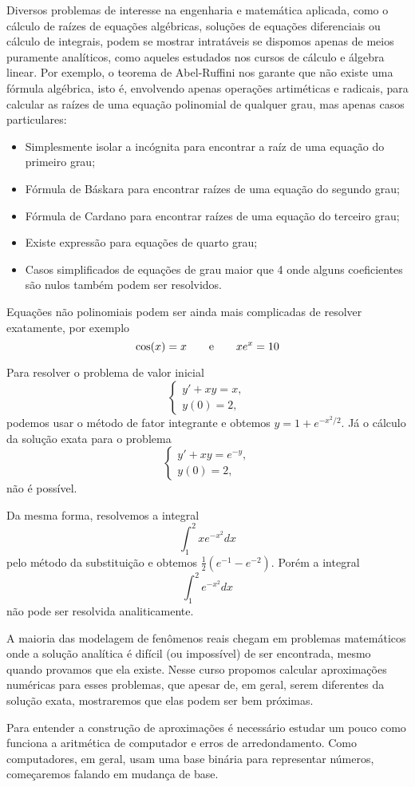 Diversos problemas de interesse na engenharia e matemática aplicada, como  o cálculo de raízes de equações algébricas, soluções de equações diferenciais ou cálculo de integrais, podem se mostrar intratáveis se dispomos apenas de meios puramente analíticos, como aqueles estudados nos cursos de cálculo e álgebra linear. Por exemplo, o teorema de Abel-Ruffini nos garante que não existe uma fórmula algébrica, isto é, envolvendo apenas operações artiméticas e radicais, para calcular as raízes de uma equação polinomial de qualquer grau, mas apenas casos particulares:
\begin{itemize}
\item Simplesmente isolar a incógnita para encontrar a raíz de uma equação do primeiro grau;
\item Fórmula de Báskara para encontrar raízes de uma equação do segundo grau;
\item Fórmula de Cardano para encontrar raízes de uma equação do terceiro grau;
\item Existe expressão para equações de quarto grau;
\item Casos simplificados de equações de grau maior que 4 onde alguns coeficientes são nulos também podem ser resolvidos.
\end{itemize}
Equações não polinomiais podem ser ainda mais complicadas de resolver exatamente, por exemplo
$$
\cos(x)=x\qquad \hbox{e}\qquad xe^x= 10
$$

Para resolver o problema de valor inicial 
$$\left\{
\begin{array}{l}
y'+xy=x,\\
y(0)=2,
\end{array}\right.
$$
podemos usar o método de fator integrante e obtemos $y=1+e^{-x^2/2}$. Já o cálculo da solução exata para o problema 
$$\left\{
\begin{array}{l}
y'+xy=e^{-y},\\
y(0)=2,
\end{array}\right.
$$
não é possível.

Da mesma forma, resolvemos a integral
$$
\int_1^2xe^{-x^2}dx
$$
pelo método da substituição e obtemos $\frac{1}{2}(e^{-1}-e^{-2})$. Porém a integral
$$
\int_1^2 e^{-x^2} dx
$$
não pode ser resolvida analiticamente.

A maioria das modelagem de fenômenos reais chegam em problemas matemáticos onde a solução analítica é difícil (ou impossível) de ser encontrada, mesmo quando provamos que ela existe. Nesse curso propomos calcular aproximações numéricas para esses problemas, que apesar de, em geral, serem diferentes da solução exata, mostraremos que elas podem ser bem próximas.

Para entender a construção de aproximações é necessário estudar um pouco como funciona a aritmética de computador e erros de arredondamento. Como computadores, em geral, usam uma base binária para representar números, começaremos falando em mudança de base.

